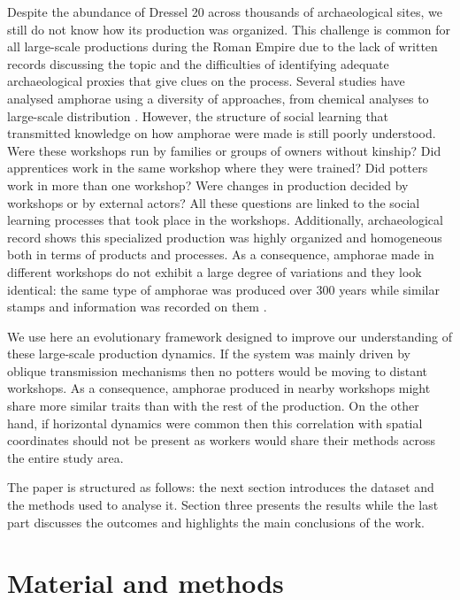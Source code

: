 \documentclass[review]{elsarticle}
\begin{document}
Despite the abundance of Dressel 20 across thousands of archaeological sites, we still do not know how its production was organized. This challenge is common for all large-scale productions during the Roman Empire due to the lack of written records discussing the topic and the difficulties of identifying adequate archaeological proxies that give clues on the process. Several studies have analysed amphorae using a diversity of approaches, from chemical analyses to large-scale distribution \citep{isaksen_network_2006,brughmans_roman_2016,coto-sarmiento_maria_bayesian_????}. However, the structure of social learning that transmitted knowledge on how amphorae were made is still poorly understood. Were these workshops run by families or groups of owners without kinship? Did apprentices work in the same workshop where they were trained? Did potters work in more than one workshop? Were changes in production decided by workshops or by external actors? All these questions are linked to the social learning processes that took place in the workshops. Additionally, archaeological record shows this specialized production was highly organized and homogeneous both in terms of products and processes. As a consequence, amphorae made in different workshops do not exhibit a large degree of variations and they look identical: the same type of amphorae was produced over 300 years while similar stamps and information was recorded on them \citep{remesal_anforas_2004}.

We use here an evolutionary framework designed to improve our understanding of these large-scale production dynamics. If the system was mainly driven by oblique transmission mechanisms then no potters would be moving to distant workshops. As a consequence, amphorae produced in nearby workshops might share more similar traits than with the rest of the production. On the other hand, if horizontal dynamics were common then this correlation with spatial coordinates should not be present as workers would share their methods across the entire study area.

The paper is structured as follows: the next section introduces the dataset and the methods used to analyse it. Section three presents the results while the last part discusses the outcomes and highlights the main conclusions of the work. 

\section{Material and methods}
\end{document}
